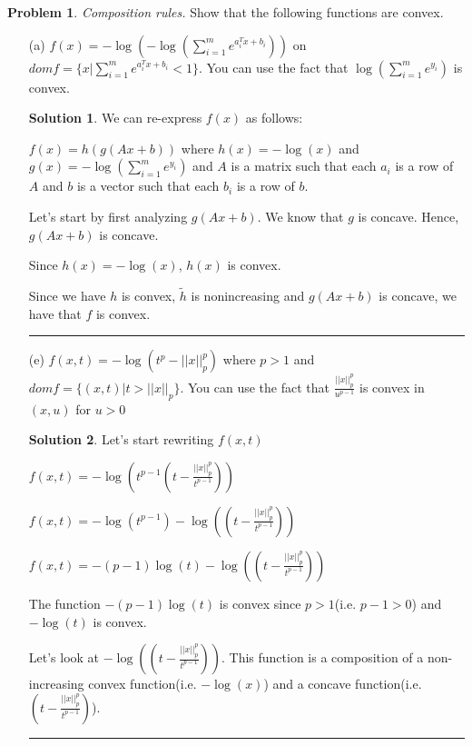 \documentclass{article}
\theoremstyle{definition}
\newtheorem{problem}{Problem}
\def\fline{\rule{0.75\linewidth}{0.5pt}}
\newcommand{\finishline}{\begin{center}\fline\end{center}}
\newtheorem*{solution*}{Solution}
\newenvironment{solution}{\begin{solution*}}{{\finishline} \end{solution*}}
\begin{document}
\begin{problem}
\textit{Composition rules.} Show that the following functions are convex.

\begin{itemize}
    \item[(a)] $f(x) = -\log(-\log(\sum_{i=1}^{m} e^{a_i^Tx + b_i}))$ on $dom f = \{ x | \sum_{i=1}^{m} e^{a_i^Tx + b_i} < 1\}$. You can use the fact that $\log(\sum_{i=1}^{m} e^{y_i})$ is convex. 

    \begin{solution}
        We can re-express $f(x)$ as follows: \newline 

        $f(x) = h(g(Ax + b))$ where $h(x) = - \log(x)$ and $g(x) = -\log(\sum_{i=1}^{m} e^{y_i})$ and $A$ is a matrix such that each $a_i$ is a row of $A$ and $b$ is a vector such that each $b_i$ is a row of $b$. 

        Let's start by first analyzing $g(Ax + b)$. We know that $g$ is concave. Hence, $g(Ax + b)$ is concave. 

        Since $h(x) = - \log(x)$, $h(x)$ is convex. 

        Since we have $h$ is convex, $\tilde{h}$ is nonincreasing and $g(Ax + b)$ is concave, we have that $f$ is convex. 
    \end{solution}

    \item[(e)] $f(x, t) = -\log(t^p - ||x||^p_p)$ where $p > 1$ and $dom f = \{(x, t) | t > ||x||_p \}$. You can use the fact that $\frac{||x||^p_p}{u^{p - 1}}$ is convex in $(x, u)$ for $u > 0$

    \begin{solution}
        Let's start rewriting $f(x, t)$ \newline 

        $f(x, t) = -\log(t^{p - 1}(t - \frac{||x||^p_p}{t^{p - 1}}))$ \newline 

        $f(x, t) = -\log(t^{p - 1}) - \log((t - \frac{||x||^p_p}{t^{p - 1}}))$

        $f(x, t) = -(p - 1)\log(t) - \log((t - \frac{||x||^p_p}{t^{p - 1}}))$

        The function $-(p - 1)\log(t)$ is convex since $p > 1$(i.e. $p - 1 > 0$) and $-\log(t)$ is convex. \newline 

        Let's look at $- \log((t - \frac{||x||^p_p}{t^{p - 1}}))$. This function is a composition of a non-increasing convex function(i.e. $-\log(x)$) and a concave function(i.e. $(t - \frac{||x||^p_p}{t^{p - 1}})$). 


\end{solution}
\end{itemize}
\end{problem}
\end{document}
